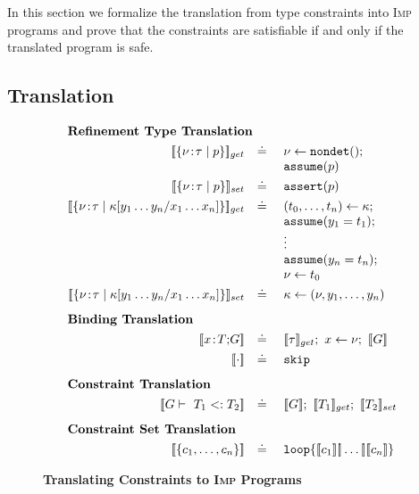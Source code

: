 \documentclass[nocopyrightspace]{sigplanconf}
\newcommand{\figbegin}{}
\newcommand{\figend}{}
\newcommand{\defeq}{\doteq\ }
\def\set#1{{\{ #1\}}}
\def\subt{<:}
\def\valu{\nu}
\newcommand{\ftyp}[2]{{{#1}\!:\!{#2}}}
\newcommand{\SUBST}[3]{{#1}[{#3}/{#2}]}
\newcommand{\EXT}[2]{{#1;\!#2}}
\newcommand{\ASSERT}[2]{\{{#1}\}\ {#2}}
\newcommand{\kvar}{\kappa}
\newcommand{\renv}{G}
\newcommand{\typ}{\tau}
\newcommand{\tliqs}{T}
\newcommand{\reftyp}[3]{\set{\ftyp{{#1}}{{#2}} \mid {#3}}}
\newcommand{\deriv}{\vdash\ }
\def\NONDET{\mathtt{nondet}}
\newcommand{\ilang}{\textsc{Imp}\xspace}
\newcommand{\ASSIGN}[2]{{#1} \leftarrow {#2}}
\newcommand{\TASSIGN}[2]{{#1} \leftarrow {#2}}
\newcommand{\HAVOC}[1]{\ASSIGN{#1}{\NONDET()}}
\def\ASSUME{{{\mathtt{assume}}}}
\def\ASSERT{{{\mathtt{assert}}}}
\newcommand{\GET}[2]{\TASSIGN{#2}{#1}}
\newcommand{\SET}[2]{\TASSIGN{#1}{#2}}
\def\SKIP{{{\mathtt{skip}}}}
\def\LOOP{{{\mathtt{loop}}}}
\def\rkvar{{\kvar}}
\def\CHOICE{{\mathrm{[\!] }}}
\begin{document}
In this section we formalize the translation from type constraints
into \ilang programs and prove that the constraints are satisfiable
if and only if the translated program is safe.

\subsection{Translation}\label{sec:translation}

\begin{figure}[t]
\figbegin
\begin{displaymath}
\begin{array}{rll}
\multicolumn{3}{l}{\mbox{\textbf{Refinement Type Translation}}}  \\[4pt]
\translate{\reftyp{\valu}{\typ}{p}}_{get}	
& \defeq & \HAVOC{\valu}; \\
&        & \ASSUME(p) \\[4pt]

\translate{\reftyp{\valu}{\typ}{p}}_{set} 	
& \defeq & \ASSERT(p) \\[4pt]

\translate{\reftyp{\valu}{\typ}{\SUBST{\kvar}{x_1 \ldots x_n}{y_1 \ldots y_n}}}_{get} 
& \defeq & \GET{\rkvar}{(t_0,\ldots,t_n)}; \\
&	 & \ASSUME(y_1 = t_1); \\
&	 & \vdots \\
&	 & \ASSUME(y_n = t_n); \\
&	 & \ASSIGN{\valu}{t_0} \\[4pt]

\translate{\reftyp{\valu}{\typ}{\SUBST{\kvar}{x_1 \ldots x_n}{y_1 \ldots y_n}}}_{set} 
& \defeq & \SET{\rkvar}{(\valu,y_1,\ldots,y_n)} \\[8pt]


\multicolumn{3}{l}{\mbox{\textbf{Binding Translation}}}  \\[4pt]
\translate{\EXT{\ftyp{x}{\tliqs}}{\renv}} 
& \defeq & \translate{\tau}_{get};\ \ASSIGN{x}{\valu};\ \translate{\renv} \\[4pt]

\translate{\cdot} 
& \defeq & \SKIP \\[8pt]


\multicolumn{3}{l}{\mbox{\textbf{Constraint Translation}}}  \\[4pt]
\translate{\renv \deriv \tliqs_1 \subt \tliqs_2}
& \defeq & \translate{\renv};\ \translate{\tliqs_1}_{get};\ \translate{\tliqs_2}_{set} \\[8pt]

\multicolumn{3}{l}{\mbox{\textbf{Constraint Set Translation}}}  \\[4pt]
\translate{\set{c_1,\ldots,c_n}} 
& \defeq & \LOOP \{ \translate{c_1} \CHOICE \ldots \CHOICE \translate{c_n} \} \\
\end{array}
\end{displaymath}
\figend
\caption{\textbf{Translating Constraints to \ilang Programs}}
\label{fig:translate}
\end{figure}
\end{document}
